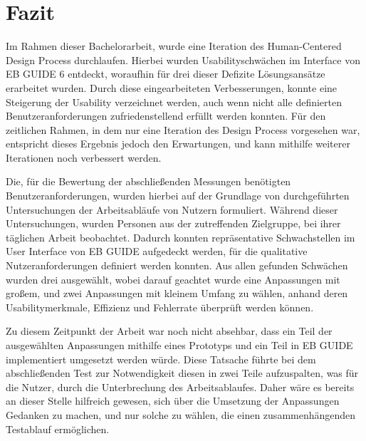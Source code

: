 \chapter{Fazit}\label{ch:summary}

Im Rahmen dieser Bachelorarbeit, wurde eine Iteration des Human-Centered Design Process durchlaufen.
Hierbei wurden Usabilityschwächen im Interface von EB GUIDE 6 entdeckt, woraufhin für drei dieser Defizite Lösungsansätze erarbeitet wurden.
Durch diese eingearbeiteten Verbesserungen, konnte eine Steigerung der Usability verzeichnet werden, auch wenn nicht alle definierten Benutzeranforderungen zufriedenstellend erfüllt werden konnten.
Für den zeitlichen Rahmen, in dem nur eine Iteration des Design Process vorgesehen war, entspricht dieses Ergebnis jedoch den Erwartungen, und kann mithilfe weiterer Iterationen noch verbessert werden.

Die, für die Bewertung der abschließenden Messungen benötigten Benutzeranforderungen, wurden hierbei auf der Grundlage von durchgeführten Untersuchungen der Arbeitsabläufe von Nutzern formuliert.
Während dieser Untersuchungen, wurden Personen aus der zutreffenden Zielgruppe, bei ihrer täglichen Arbeit beobachtet.
Dadurch konnten repräsentative Schwachstellen im User Interface von EB GUIDE aufgedeckt werden, für die qualitative Nutzeranforderungen definiert werden konnten.
Aus allen gefunden Schwächen wurden drei ausgewählt, wobei darauf geachtet wurde eine Anpassungen mit großem, und zwei Anpassungen mit kleinem Umfang zu wählen, anhand deren Usabilitymerkmale, Effizienz und Fehlerrate überprüft werden können.

Zu diesem Zeitpunkt der Arbeit war noch nicht absehbar, dass ein Teil der ausgewählten Anpassungen mithilfe eines Prototyps und ein Teil in EB GUIDE implementiert umgesetzt werden würde.
Diese Tatsache führte bei dem abschließenden Test zur Notwendigkeit diesen in zwei Teile aufzuspalten, was für die Nutzer, durch die Unterbrechung des Arbeitsablaufes.
Daher wäre es bereits an dieser Stelle hilfreich gewesen, sich über die Umsetzung der Anpassungen Gedanken zu machen, und nur solche zu wählen, die einen zusammenhängenden Testablauf ermöglichen.

